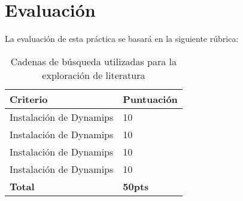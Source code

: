 \section{Evaluación}
La evaluación de esta práctica se basará en la siguiente rúbrica:

\centering

\begin{table}[h]
\centering
\caption{Cadenas de búsqueda utilizadas para la exploración de literatura}\label{tab1}
\begin{tabularx}{0.8\textwidth}{|p{9cm}|X|}
\hline

\centering\textbf{Criterio} & \textbf{ Puntuación} \\

\hline
Instalación de Dynamips & 10 \\
Instalación de Dynamips & 10 \\
Instalación de Dynamips & 10 \\
Instalación de Dynamips & 10 \\
\hline
\textbf{Total}&\textbf{50pts} \\
\hline
\end{tabularx}
\end{table}
    


